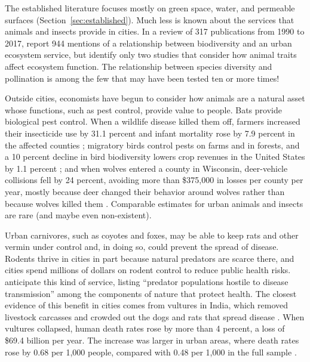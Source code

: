\documentclass[12pt]{article}
\begin{document}
The established literature focuses mostly on green space, water, and permeable surfaces (Section~\ref{sec:established}). Much less is known about the services that animals and insects provide in cities. In a review of 317 publications from 1990 to 2017, \citet{schwarzUnderstandingBiodiversityecosystemService2017} report 944 mentions of a relationship between biodiversity and an urban ecosystem service, but identify only two studies that consider how animal traits affect ecosystem function. The relationship between species diversity and pollination is among the few that may have been tested ten or more times!

Outside cities, economists have begun to consider how animals are a natural asset whose functions, such as pest control, provide value to people. Bats provide biological pest control. When a wildlife disease killed them off, farmers increased their insecticide use by 31.1 percent and infant mortality rose by 7.9 percent in the affected counties \citep{frankEconomicImpactsEcosystem2024}; migratory birds control pests on farms and in forests, and a 10 percent decline in bird biodiversity lowers crop revenues in the United States by 1.1 percent \citep{noackValueBiodiversityEvidence2025}; and when wolves entered a county in Wisconsin, deer-vehicle collisions fell by 24 percent, avoiding more than \$375,000 in losses per county per year, mostly because deer changed their behavior around wolves rather than because wolves killed them \citep{raynorWolvesMakeRoadways2021}. Comparable estimates for urban animals and insects are rare (and maybe even non-existent).

Urban carnivores, such as coyotes and foxes, may be able to keep rats and other vermin under control and, in doing so, could prevent the spread of disease. Rodents thrive in cities in part because natural predators are scarce there, and cities spend millions of dollars on rodent control to reduce public health risks. \citet{boydWhatAreEcosystem2007} anticipate this kind of service, listing ``predator populations hostile to disease transmission'' among the components of nature that protect health. The closest evidence of this benefit in cities comes from vultures in India, which removed livestock carcasses and crowded out the dogs and rats that spread disease \citep{frankSocialCostsKeystone2023}. When vultures collapsed, human death rates rose by more than 4 percent, a loss of \$69.4 billion per year. The increase was larger in urban areas, where death rates rose by 0.68 per 1,000 people, compared with 0.48 per 1,000 in the full sample \citep{frankSocialCostsKeystone2023}.
\end{document}
